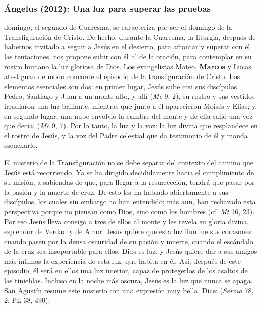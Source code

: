 \subsubsection{Ángelus (2012): Una luz para superar las pruebas}


\begin{body}
 domingo, el segundo de Cuaresma, se caracteriza por ser el domingo de la Transfiguración de Cristo. De hecho, durante la Cuaresma, la liturgia, después de habernos invitado a seguir a Jesús en el desierto, para afrontar y superar con él las tentaciones, nos propone subir con él al  de la oración, para contemplar en su rostro humano la luz gloriosa de Dios. Los evangelistas Mateo, \textbf{Marcos} y Lucas atestiguan de modo concorde el episodio de la transfiguración de Cristo. Los elementos esenciales son dos: en primer lugar, Jesús sube con sus discípulos Pedro, Santiago y Juan a un monte alto, y allí  (\textit{Mc} 9, 2), su rostro y sus vestidos irradiaron una luz brillante, mientras que junto a él aparecieron Moisés y Elías; y, en segundo lugar, una nube envolvió la cumbre del monte y de ella salió una voz que decía:  (\textit{Mc} 9, 7). Por lo tanto, la luz y la voz: la luz divina que resplandece en el rostro de Jesús, y la voz del Padre celestial que da testimonio de él y manda escucharlo.

El misterio de la Transfiguración no se debe separar del contexto del camino que Jesús está recorriendo. Ya se ha dirigido decididamente hacia el cumplimiento de su misión, a sabiendas de que, para llegar a la resurrección, tendrá que pasar por la pasión y la muerte de cruz. De esto les ha hablado abiertamente a sus discípulos, los cuales sin embargo no han entendido; más aun, han rechazado esta perspectiva porque no piensan como Dios, sino como los hombres (cf. \textit{Mt} 16, 23). Por eso Jesús lleva consigo a tres de ellos al monte y les revela su gloria divina, esplendor de Verdad y de Amor. Jesús quiere que esta luz ilumine sus corazones cuando pasen por la densa oscuridad de su pasión y muerte, cuando el escándalo de la cruz sea insoportable para ellos. Dios es luz, y Jesús quiere dar a sus amigos más íntimos la experiencia de esta luz, que habita en él. Así, después de este episodio, él será en ellos una luz interior, capaz de protegerlos de los asaltos de las tinieblas. Incluso en la noche más oscura, Jesús es la luz que nunca se apaga. San Agustín resume este misterio con una expresión muy bella. Dice:  (\textit{Sermo} 78, 2: PL 38, 490).


\end{body}
